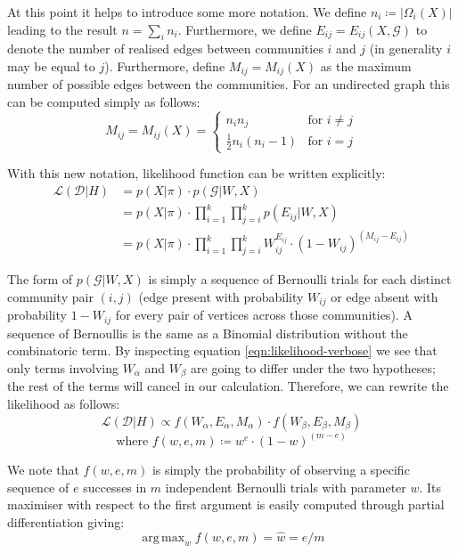 \documentclass[]{article}
\DeclareMathOperator*{\argmax}{arg\,max}
\newcommand{\Dcal}{\mathcal{D}}
\newcommand{\Gcal}{\mathcal{G}}
\newcommand{\lik}{\mathcal{L}}
\begin{document}
At this point it helps to introduce some more notation. We define $n_i \coloneqq |\Omega_i(X)|$ leading to the result $n = \sum_i n_i$. Furthermore, we define $E_{ij} = E_{ij}(X, \Gcal)$ to denote the number of realised edges between communities $i$ and $j$ (in generality $i$ may be equal to $j$). Furthermore, define $M_{ij} = M_{ij}(X)$ as the maximum number of possible edges between the communities. For an undirected graph this can be computed simply as follows:
%
\begin{equation}
	M_{ij} = M_{ij} (X) = \begin{cases}
		n_i n_j &\text{for } i \neq j \\
		\frac{1}{2}n_i (n_i - 1) &\text{for } i = j
	\end{cases}
\end{equation}

With this new notation, likelihood function can be written explicitly:
%
\begin{align}
\lik(\Dcal | H) &= p(X| \pi) \cdot p(\Gcal | W, X) \nonumber \\
&= p(X | \pi) \cdot \prod_{i=1}^{k} \prod_{j=i}^{k} p(E_{ij} | W, X) \nonumber \\
&= p(X | \pi) \cdot \prod_{i=1}^{k} \prod_{j=i}^{k} W_{ij} ^ {E_{ij}} \cdot \left( 1 - W_{ij} \right) ^ {(M_{ij} - E_{ij})}
\label{eqn:likelihood-verbose}
\end{align}

The form of $p(\Gcal | W, X)$ is simply a sequence of Bernoulli trials for each distinct community pair $(i, j)$ (edge present with probability $W_{ij}$ or edge absent with probability $1 - W_{ij}$ for every pair of vertices across those communities). A sequence of Bernoullis is the same as a Binomial distribution without the combinatoric term. By inspecting equation \ref{eqn:likelihood-verbose} we see that only terms involving $W_{\alpha}$ and $W_{\beta}$ are going to differ under the two hypotheses; the rest of the terms will cancel in our calculation. Therefore, we can rewrite the likelihood as follows:
%
\begin{equation}
	\lik (\Dcal | H) \propto f (W_\alpha, E_\alpha, M_\alpha) \cdot f (W_\beta, E_\beta, M_\beta)
\end{equation} 
\begin{equation}
	\textrm{where } f (w, e, m) \coloneqq w^e \cdot (1-w)^{(m - e)}
	\label{eqn:f-defn}
\end{equation}

We note that $f(w, e, m)$ is simply the probability of observing a specific sequence of $e$ successes in $m$ independent Bernoulli trials with parameter $w$. Its maximiser with respect to the first argument is easily computed through partial differentiation giving:
%
\begin{equation}
	\argmax_w f(w, e, m) = \hat{w} = e / m
	\label{eqn:f-maximiser}
\end{equation}
\end{document}
